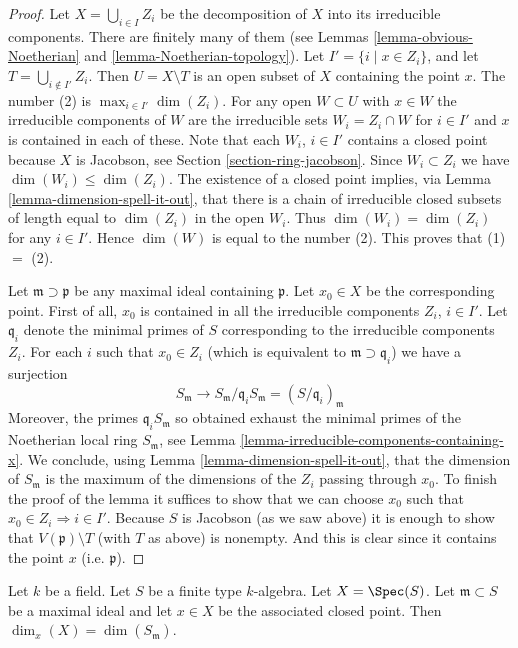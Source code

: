 \begin{proof}
Let $X = \bigcup_{i \in I} Z_i$ be the decomposition of $X$ into
its irreducible components. There are finitely many of
them (see
Lemmas \ref{lemma-obvious-Noetherian} and \ref{lemma-Noetherian-topology}).
Let $I' = \{i \mid x \in Z_i\}$, and let
$T = \bigcup_{i \not \in I'} Z_i$. Then $U = X \setminus T$
is an open subset of $X$ containing the point $x$.
The number (2) is $\max_{i \in I'} \dim(Z_i)$.
For any open $W \subset U$ with $x \in W$
the irreducible components of $W$ are the irreducible sets
$W_i = Z_i \cap W$ for $i \in I'$ and $x$ is contained
in each of these.
Note that each $W_i$, $i \in I'$ contains a closed point because
$X$ is Jacobson, see Section \ref{section-ring-jacobson}.
Since $W_i \subset Z_i$ we have $\dim(W_i) \leq \dim(Z_i)$.
The existence of a closed point implies, via Lemma
\ref{lemma-dimension-spell-it-out}, that there is a chain of
irreducible closed subsets of length equal to $\dim(Z_i)$ in the open $W_i$.
Thus $\dim(W_i) = \dim(Z_i)$ for any $i \in I'$. Hence $\dim(W)$
is equal to the number (2). This proves that (1) $ = $ (2).

\medskip\noindent
Let $\mathfrak m \supset \mathfrak p$ be any maximal ideal
containing $\mathfrak p$. Let $x_0 \in X$ be the corresponding
point. First of all, $x_0$ is contained in all the
irreducible components $Z_i$, $i \in I'$. Let $\mathfrak q_i$
denote the minimal primes of $S$ corresponding to the
irreducible components $Z_i$. For each $i$ such that
$x_0 \in Z_i$ (which is equivalent to $\mathfrak m \supset \mathfrak q_i$)
we have a surjection
$$
S_{\mathfrak m} \longrightarrow
S_\mathfrak m/\mathfrak q_i S_\mathfrak m =(S/\mathfrak q_i)_{\mathfrak m}
$$
Moreover, the primes $\mathfrak q_i S_\mathfrak m$ so obtained
exhaust the minimal
primes of the Noetherian local ring $S_{\mathfrak m}$, see
Lemma \ref{lemma-irreducible-components-containing-x}.
We conclude, using Lemma \ref{lemma-dimension-spell-it-out},
that the dimension of $S_{\mathfrak m}$ is the
maximum of the dimensions of the $Z_i$ passing through $x_0$.
To finish the proof of the lemma it suffices to show that
we can choose $x_0$ such that $x_0 \in Z_i \Rightarrow i \in I'$.
Because $S$ is Jacobson (as we saw above)
it is enough to show that $V(\mathfrak p) \setminus T$
(with $T$ as above) is nonempty. And this is clear since it
contains the point $x$ (i.e. $\mathfrak p$).
\end{proof}

\begin{lemma}
\label{lemma-dimension-closed-point-finite-type-field}
Let $k$ be a field.
Let $S$ be a finite type $k$-algebra.
Let $X = \Spec(S)$.
Let $\mathfrak m \subset S$ be a maximal ideal and let
$x \in X$ be the associated closed point.
Then $\dim_x(X) = \dim(S_{\mathfrak m})$.
\end{lemma}

